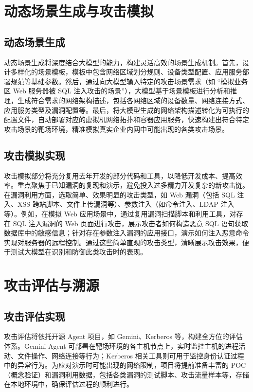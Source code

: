 \documentclass[lang=cn,10pt]{elegantbook}
\begin{document}
\section{动态场景生成与攻击模拟}
\subsection{动态场景生成}
动态场景生成将深度结合大模型的能力，构建灵活高效的场景生成机制。首先，设计多样化的场景模板，模板中包含网络区域划分规则、设备类型配置、应用服务部署规范等基础参数。然后，通过向大模型输入特定的攻击场景需求（如 “模拟业务区 Web 服务器被 SQL 注入攻击的场景”），大模型基于场景模板进行分析和推理，生成符合需求的网络架构描述，包括各网络区域的设备数量、网络连接方式、应用服务类型及漏洞配置等。最后，将大模型生成的网络架构描述转化为可执行的配置文件，自动部署对应的虚拟机网络拓扑和容器应用服务，快速构建出符合特定攻击场景的靶场环境，精准模拟真实企业内网中可能出现的各类攻击场景。

\subsection{攻击模拟实现}
攻击模拟部分将充分复用去年开发的部分代码和工具，以降低开发成本、提高效率。重点聚焦于已知漏洞的复现和演示，避免投入过多精力开发复杂的新攻击链。在漏洞利用方面，选取简单、效果明显的攻击类型，如 Web 漏洞（包括 SQL 注入、XSS 跨站脚本、文件上传漏洞等）、参数注入（如命令注入、LDAP 注入等）。例如，在模拟 Web 应用场景中，通过复用漏洞扫描脚本和利用工具，对存在 SQL 注入漏洞的 Web 页面进行攻击，展示攻击者如何构造恶意 SQL 语句获取数据库中的敏感信息；针对存在参数注入漏洞的应用接口，演示如何注入恶意命令实现对服务器的远程控制。通过这些简单直观的攻击类型，清晰展示攻击效果，便于测试大模型在识别和防御此类攻击时的表现。

\section{攻击评估与溯源}
\subsection{攻击评估实现}
攻击评估将依托开源 Agent 项目，如 Gemini、Kerberos 等，构建全方位的评估体系。Gemini Agent 可部署在靶场环境的各主机节点上，实时监控主机的进程活动、文件操作、网络连接等行为；Kerberos 相关工具则可用于监控身份认证过程中的异常行为。为应对演示时可能出现的网络限制，项目将提前准备丰富的 POC（概念验证）和漏洞利用数据，包括各类漏洞的测试脚本、攻击流量样本等，存储在本地环境中，确保评估过程的顺利进行。​
\end{document}
